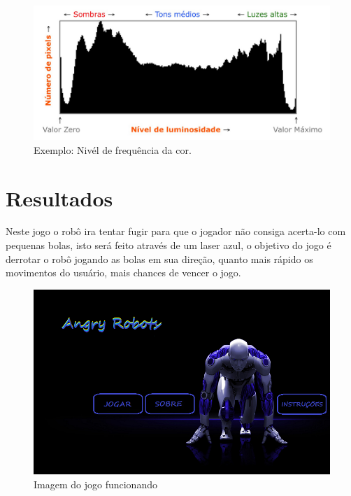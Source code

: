 \documentclass[12pt,openright,oneside,a4paper,brazil]{abntex2}
\begin{document}
\begin{figure}[!htb]
\centering
\includegraphics[scale=0.2]{histograma.jpg}
\caption{Exemplo: Nivél de frequência da cor.}
\end{figure}

\section*{Resultados}

Neste jogo o robô ira tentar fugir para que o jogador não consiga acerta-lo com pequenas bolas, 
isto será feito através de um laser azul, o objetivo do jogo é derrotar o robô jogando as bolas em sua direção, quanto mais rápido os movimentos do usuário, mais chances de vencer o jogo.

\begin{figure}[!htb]
\centering
\includegraphics[scale=0.3]{menu.png}
\caption{Imagem do jogo funcionando}
\end{figure}
\vspace{0.5cm}
\end{document}
